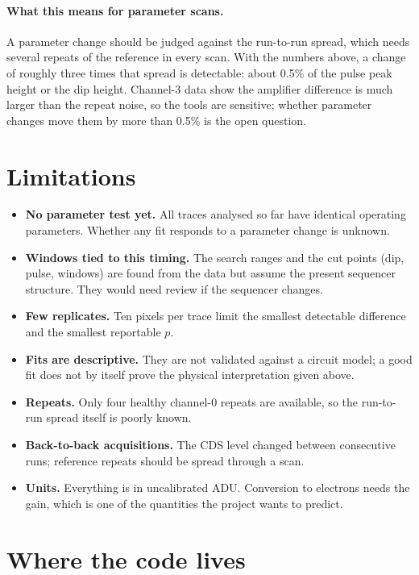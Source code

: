\documentclass[11pt]{article}
\begin{document}
\paragraph{What this means for parameter scans.} A parameter change should be judged against the run-to-run spread, which needs several repeats of the
reference in every scan. With the numbers above, a change of roughly three times that spread is detectable: about 0.5\% of the pulse peak
height or the dip height. Channel-3 data show the amplifier difference is much larger than the repeat noise, so the tools are
sensitive; whether parameter changes move them by more than 0.5\% is the open question.

\section{Limitations}

\begin{itemize}
  \item \textbf{No parameter test yet.} All traces analysed so far have identical operating parameters.
        Whether any fit responds to a parameter change is unknown.
  \item \textbf{Windows tied to this timing.} The search ranges and the cut points (dip, pulse, windows) are
        found from the data but assume the present sequencer structure. They would need review if the
        sequencer changes.
  \item \textbf{Few replicates.} Ten pixels per trace limit the smallest detectable difference and the
        smallest reportable $p$.
  \item \textbf{Fits are descriptive.} They are not validated against a circuit model; a good fit does not by
        itself prove the physical interpretation given above.
  \item \textbf{Repeats.} Only four healthy channel-0 repeats are available, so the run-to-run spread itself is poorly known.
  \item \textbf{Back-to-back acquisitions.} The CDS level changed between consecutive runs; reference repeats should be spread through a scan.
  \item \textbf{Units.} Everything is in uncalibrated ADU. Conversion to electrons needs the gain, which is one of
        the quantities the project wants to predict.
\end{itemize}

\section{Where the code lives}
\end{document}
